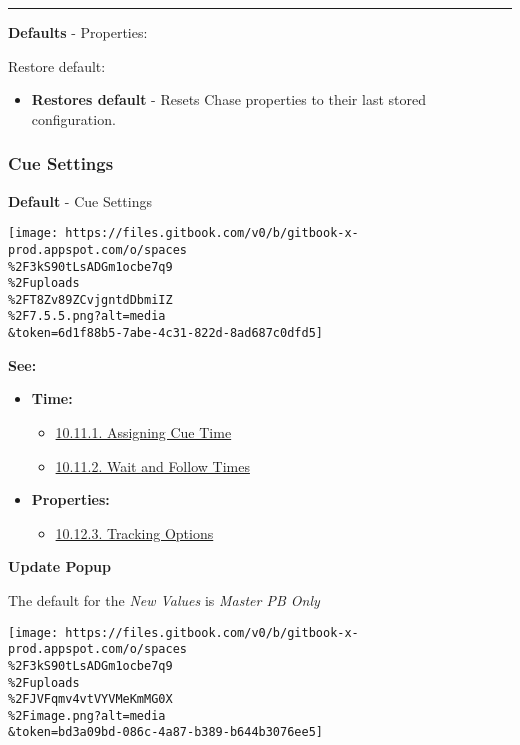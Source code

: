 \documentclass[
]{article}
\providecommand{\tightlist}{%
  \setlength{\itemsep}{0pt}\setlength{\parskip}{0pt}}
\begin{document}
\begin{center}\rule{0.5\linewidth}{0.5pt}\end{center}

\textbf{Defaults} - Properties:

Restore default:

\begin{itemize}
\tightlist
\item
  \textbf{Restores default} - Resets Chase properties to their last stored configuration.
\end{itemize}

\hypertarget{cue-settings}{%
\subsubsection{Cue Settings}\label{cue-settings}}

\textbf{Default} - Cue Settings

\texttt{[image: https://files.gitbook.com/v0/b/gitbook-x-prod.appspot.com/o/spaces\\\%2F3kS90tLsADGm1ocbe7q9\\\%2Fuploads\\\%2FT8Zv89ZCvjgntdDbmiIZ\\\%2F7.5.5.png?alt=media\\\&token=6d1f88b5-7abe-4c31-822d-8ad687c0dfd5]}

\textbf{See:}

\begin{itemize}
\item
  \textbf{Time:}

  \begin{itemize}
  \item
    \href{https://vibemanual.compulite.com/programming-cues-and-scenes.html\#assigning-cue-time}{10.11.1. Assigning Cue Time}
  \item
    \href{https://vibemanual.compulite.com/programming-cues-and-scenes.html\#wait-and-follow-times}{10.11.2. Wait and Follow Times}
  \end{itemize}
\item
  \textbf{Properties:}

  \begin{itemize}
  \tightlist
  \item
    \href{https://vibemanual.compulite.com/programming-cues-and-scenes.html\#tracking-options}{10.12.3. Tracking Options}
  \end{itemize}
\end{itemize}

\textbf{Update Popup}

The default for the \emph{New Values} is \emph{Master PB Only}

\texttt{[image: https://files.gitbook.com/v0/b/gitbook-x-prod.appspot.com/o/spaces\\\%2F3kS90tLsADGm1ocbe7q9\\\%2Fuploads\\\%2FJVFqmv4vtVYVMeKmMG0X\\\%2Fimage.png?alt=media\\\&token=bd3a09bd-086c-4a87-b389-b644b3076ee5]}
\end{document}
